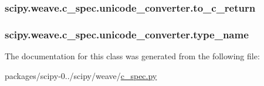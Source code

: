 \subsubsection[{to\+\_\+c\+\_\+return}]{\setlength{\rightskip}{0pt plus 5cm}scipy.\+weave.\+c\+\_\+spec.\+unicode\+\_\+converter.\+to\+\_\+c\+\_\+return}\label{classscipy_1_1weave_1_1c__spec_1_1unicode__converter_a32921c224e3152909f197f6de402eae0}
\hypertarget{classscipy_1_1weave_1_1c__spec_1_1unicode__converter_ad032b19394f00de185d667f687456cca}{}
\subsubsection[{type\+\_\+name}]{\setlength{\rightskip}{0pt plus 5cm}scipy.\+weave.\+c\+\_\+spec.\+unicode\+\_\+converter.\+type\+\_\+name}\label{classscipy_1_1weave_1_1c__spec_1_1unicode__converter_ad032b19394f00de185d667f687456cca}


The documentation for this class was generated from the following file\+:\begin{DoxyCompactItemize}
\item 
packages/scipy-\/0../scipy/weave/\hyperlink{c__spec_8py}{c\+\_\+spec.\+py}\end{DoxyCompactItemize}
